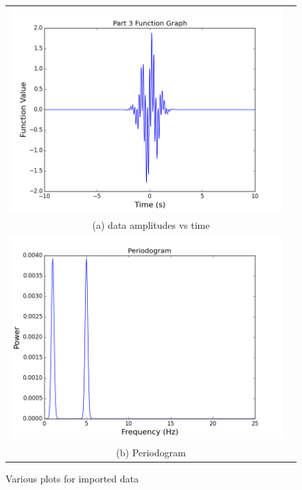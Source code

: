 \documentclass[11pt]{article}
\begin{document}
\begin{figure}[ht]
\centering
\begin{tabular}{cc}
\includegraphics[scale=.4]{prt3_function.png} \\
\multicolumn{2}{c}{(a) data amplitudes vs time} \\[6pt]

\includegraphics[scale=.4]{prt3_periodogram.png}\\
\multicolumn{2}{c}{(b) Periodogram} \\[6pt]

\end{tabular}
\caption{Various plots for imported data}
\end{figure}
\end{document}
